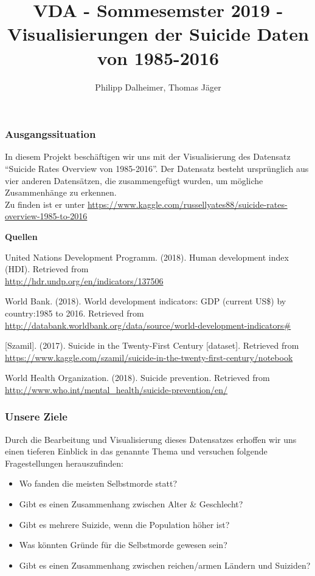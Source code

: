 \documentclass[]{article}
\title{VDA - Sommesemster 2019 - Visualisierungen der Suicide Daten von
1985-2016}
\author{Philipp Dalheimer, Thomas Jäger}
\date{}
\providecommand{\tightlist}{%
  \setlength{\itemsep}{0pt}\setlength{\parskip}{0pt}}
\begin{document}
\maketitle

\hypertarget{ausgangssituation}{%
\subsubsection{Ausgangssituation}\label{ausgangssituation}}

In diesem Projekt beschäftigen wir uns mit der Visualisierung des
Datensatz ``Suicide Rates Overview von 1985-2016''. Der Datensatz
besteht ursprünglich aus vier anderen Datensätzen, die zusammengefügt
wurden, um mögliche Zusammenhänge zu erkennen.\\
Zu finden ist er unter
\url{https://www.kaggle.com/russellyates88/suicide-rates-overview-1985-to-2016}

\textbf{Quellen}

United Nations Development Programm. (2018). Human development index
(HDI). Retrieved from\\
\url{http://hdr.undp.org/en/indicators/137506}

World Bank. (2018). World development indicators: GDP (current US\$) by
country:1985 to 2016. Retrieved from
\url{http://databank.worldbank.org/data/source/world-development-indicators\#}

{[}Szamil{]}. (2017). Suicide in the Twenty-First Century {[}dataset{]}.
Retrieved from\\
\url{https://www.kaggle.com/szamil/suicide-in-the-twenty-first-century/notebook}

World Health Organization. (2018). Suicide prevention. Retrieved from\\
\url{http://www.who.int/mental_health/suicide-prevention/en/}

\hypertarget{unsere-ziele}{%
\subsubsection{Unsere Ziele}\label{unsere-ziele}}

Durch die Bearbeitung und Visualisierung dieses Datensatzes erhoffen wir
uns einen tieferen Einblick in das genannte Thema und versuchen folgende
Fragestellungen herauszufinden:

\begin{itemize}
\tightlist
\item
  Wo fanden die meisten Selbstmorde statt?
\item
  Gibt es einen Zusammenhang zwischen Alter \& Geschlecht?
\item
  Gibt es mehrere Suizide, wenn die Population höher ist?
\item
  Was könnten Gründe für die Selbstmorde gewesen sein?
\item
  Gibt es einen Zusammenhang zwischen reichen/armen Ländern und
  Suiziden?
\end{itemize}
\end{document}
